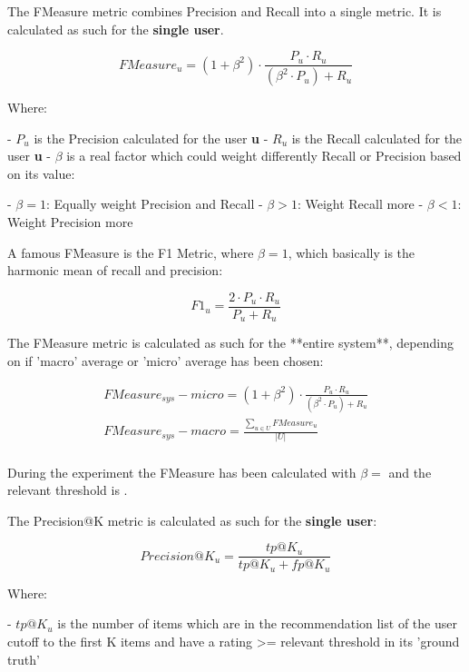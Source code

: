 \documentclass[11pt]{article}
\begin{document}
The FMeasure metric combines Precision and Recall into a single metric.
It is calculated as such for the \textbf{single user}.

    \[
    FMeasure_u = (1 + \beta^2) \cdot \frac{P_u \cdot R_u}{(\beta^2 \cdot P_u) + R_u}
    \]

    Where:

    - $P_u$ is the Precision calculated for the user \textbf{u}
    - $R_u$ is the Recall calculated for the user \textbf{u}
    - $\beta$ is a real factor which could weight differently Recall or Precision based on its value:

        - $\beta = 1$: Equally weight Precision and Recall
        - $\beta > 1$: Weight Recall more
        - $\beta < 1$: Weight Precision more

\hfill\break

A famous FMeasure is the F1 Metric, where $\beta = 1$, which basically is the harmonic mean of recall and
precision:

    \[
    F1_u = \frac{2 \cdot P_u \cdot R_u}{P_u + R_u}
    \]

\hfill\break

The FMeasure metric is calculated as such for the **entire system**, depending on if 'macro' average or 'micro'
average has been chosen:

    \begin{gather*}
        FMeasure_{sys} - micro = (1 + \beta^2) \cdot \frac{P_u \cdot R_u}{(\beta^2 \cdot P_u) + R_u}\\
        FMeasure_{sys} - macro = \frac{\sum_{u \in U} FMeasure_u}{|U|}\\
    \end{gather*}

\hfill\break
During the experiment the FMeasure has been calculated with $\beta = $
 and the relevant threshold is
\textbf{}.


The Precision@K metric is calculated as such for the \textbf{single user}:

    \[
    Precision@K_u = \frac{tp@K_u}{tp@K_u + fp@K_u}
    \]

    Where:

    - $tp@K_u$ is the number of items which are in the recommendation list of the user
      cutoff to the first K items and have a rating >= relevant threshold in its 'ground truth'
\end{document}
